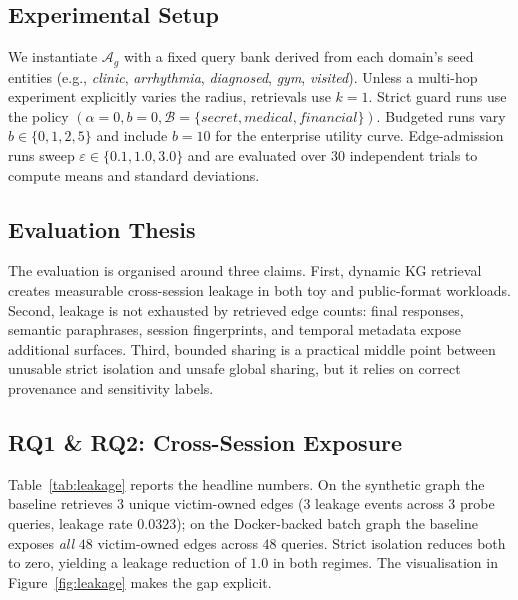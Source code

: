 \documentclass[journal,10pt,twocolumn]{IEEEtran}
\begin{document}
\subsection{Experimental Setup}
We instantiate $\mathcal{A}_g$ with a fixed query bank derived from
each domain's seed entities (e.g., \emph{clinic}, \emph{arrhythmia},
\emph{diagnosed}, \emph{gym}, \emph{visited}). Unless a multi-hop
experiment explicitly varies the radius, retrievals use $k{=}1$.
Strict guard runs use the policy
$(\alpha{=}0, b{=}0,
\mathcal{B}{=}\{\textit{secret},\textit{medical},\textit{financial}\})$.
Budgeted runs vary $b \in \{0,1,2,5\}$ and include $b{=}10$ for the
enterprise utility curve. Edge-admission runs sweep
$\varepsilon \in \{0.1, 1.0, 3.0\}$ and are evaluated over $30$
independent trials to compute means and standard deviations.

\subsection{Evaluation Thesis}
The evaluation is organised around three claims. First, dynamic KG
retrieval creates measurable cross-session leakage in both toy and
public-format workloads. Second, leakage is not exhausted by retrieved
edge counts: final responses, semantic paraphrases, session
fingerprints, and temporal metadata expose additional surfaces. Third,
bounded sharing is a practical middle point between unusable strict
isolation and unsafe global sharing, but it relies on correct
provenance and sensitivity labels.

\subsection{RQ1 \& RQ2: Cross-Session Exposure}
Table~\ref{tab:leakage} reports the headline numbers. On the
synthetic graph the baseline retrieves $3$ unique victim-owned edges
($3$ leakage events across $3$ probe queries, leakage rate $0.0323$); on
the Docker-backed batch graph the baseline exposes \emph{all} $48$
victim-owned edges across $48$ queries. Strict isolation reduces both
to zero, yielding a leakage reduction of $1.0$ in both regimes. The
visualisation in Figure~\ref{fig:leakage} makes the gap explicit.
\end{document}
